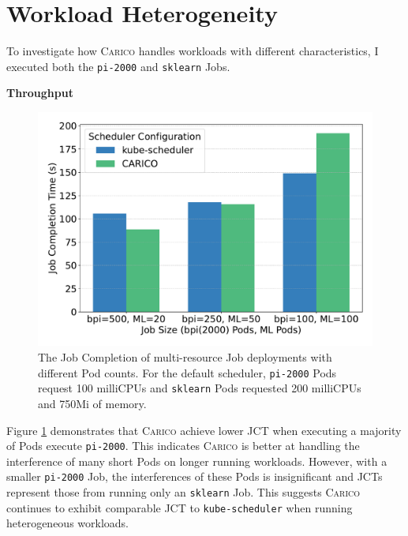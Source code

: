 \section{Workload Heterogeneity}
\label{sec:eval-hetero}
To investigate how \textsc{Carico} handles workloads with different
characteristics, I executed both the \texttt{pi-2000} and \texttt{sklearn} Jobs.

\textbf{Throughput}\\
\begin{figure}[ht!]
    \centering
    \includegraphics[width=\textwidth]{images/mixed-job-completion.pdf}
    \caption{The Job Completion of multi-resource Job deployments with different Pod
    counts. For the default scheduler, \texttt{pi-2000} Pods request 100
    milliCPUs and \texttt{sklearn} Pods requested 200 milliCPUs and 750Mi of
    memory.}
    \label{fig:mixed-throughput}
\end{figure}

Figure \ref{fig:mixed-throughput} demonstrates that \textsc{Carico} achieve
lower JCT when executing a majority of Pods execute \texttt{pi-2000}.
This indicates \textsc{Carico} is better at handling the interference of many
short Pods on longer running workloads. However, with a smaller \texttt{pi-2000}
Job, the interferences of these Pods is insignificant and JCTs represent those
from running only an \texttt{sklearn} Job. This suggests \textsc{Carico}
continues to exhibit comparable JCT to \texttt{kube-scheduler} when running
heterogeneous workloads.

